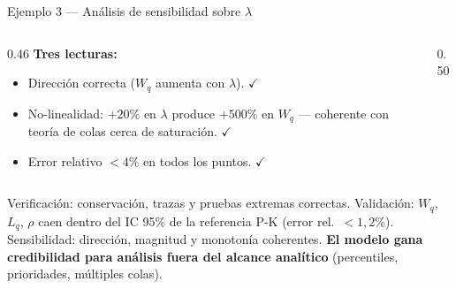 \documentclass[aspectratio=1610, 10pt]{beamer}
\begin{document}
\begin{frame}{Ejemplo 3 — Análisis de sensibilidad sobre $\lambda$}
\begin{columns}[T]
\begin{column}{0.46\textwidth}
      \vspace{4pt}
      \footnotesize
      \textbf{Tres lecturas:}
      \begin{itemize}\itemsep1pt
        \item Dirección correcta ($W_q$ aumenta con $\lambda$). $\checkmark$
        \item No-linealidad: $+20\%$ en $\lambda$ produce $+500\%$ en $W_q$
          — coherente con teoría de colas cerca de saturación. $\checkmark$
        \item Error relativo $<4\%$ en todos los puntos. $\checkmark$
      \end{itemize}
    \end{column}
    \begin{column}{0.50\textwidth}
    \end{column}
  \end{columns}

  \vspace{2pt}
  \begin{resultadobox}
    \footnotesize
    Verificación: conservación, trazas y pruebas extremas correctas.
    Validación: $W_q$, $L_q$, $\rho$ caen dentro del IC 95\% de la referencia P-K
    (error rel.\ $<1{,}2\%$). Sensibilidad: dirección, magnitud y monotonía
    coherentes. \textbf{El modelo gana credibilidad para análisis fuera del
    alcance analítico} (percentiles, prioridades, múltiples colas).
  \end{resultadobox}
\end{frame}
\end{document}
